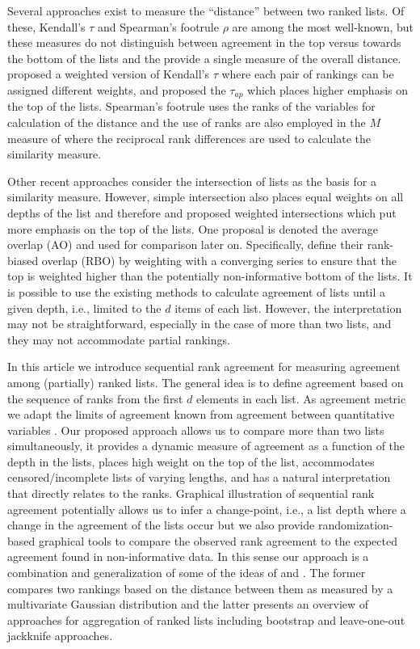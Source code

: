 \documentclass[12pt,a4paper]{article}
\theoremstyle{plain}
\begin{document}
Several approaches exist to measure the ``distance'' between two
ranked lists. Of these, Kendall's $\tau$ \citep{kendall1948} and
Spearman’s footrule $\rho$ \citep{Spearman1910} are among the most
well-known, but these measures do not distinguish between agreement in
the top versus towards the bottom of the lists and the provide a
single measure of the overall distance. \citet{Shieh1998} proposed a
weighted version of Kendall's $\tau$ where each pair of rankings can
be assigned different weights, and \citet{Yilmaz2008} proposed the
$\tau_{ap}$ which places higher emphasis on the top of the lists.
Spearman’s footrule uses the ranks of the variables for calculation of
the distance and the use of ranks are also employed in the $M$ measure
of \citet{Bar-Ilan2006} where the reciprocal rank differences are used
to calculate the similarity measure.



Other recent approaches consider the intersection of lists as the basis
for a similarity measure. However, simple intersection also places
equal weights on all depths of the list and therefore \citet{Fagin2003} and
\citet{Webber2010} proposed weighted intersections which put more
emphasis on the top of the lists. One proposal is denoted the average
overlap (AO) and used for comparison later on. Specifically,
\citet{Webber2010} define their rank-biased overlap (RBO) by weighting
with a converging series to ensure that the top is weighted higher
than the potentially non-informative bottom of the lists.
It is possible to use the existing methods to calculate agreement of
lists until a given depth, i.e., limited to the $d$ items of each
list. However, the interpretation may not be straightforward,
especially in the case of more than two lists, and they may not
accommodate partial rankings.

In this article we introduce sequential rank agreement for measuring
agreement among (partially) ranked lists.  The general idea is to
define agreement based on the sequence of ranks from the first $d$
elements in each list. As agreement metric we adapt the limits of
agreement known from agreement between quantitative variables
\citep{alt:bland:1983,Carstensen2010}. Our proposed approach allows us
to compare more than two lists simultaneously, it provides a dynamic
measure of agreement as a function of the depth in the lists, places
high weight on the top of the list, accommodates censored/incomplete
lists of varying lengths, and has a natural interpretation that
directly relates to the ranks. Graphical illustration of sequential
rank agreement potentially allows us to infer a change-point, i.e., a
list depth where a change in the agreement of the lists occur but we
also provide randomization-based graphical tools to compare the
observed rank agreement to the expected agreement found in
non-informative data.  In this sense our approach is a combination and
generalization of some of the ideas of \citet{Carterette2009} and
\citet{Boulesteix2009}. The former compares two rankings based on the
distance between them as measured by a multivariate Gaussian
distribution and the latter presents an overview of approaches for
aggregation of ranked lists including bootstrap and leave-one-out
jackknife approaches.
\end{document}
